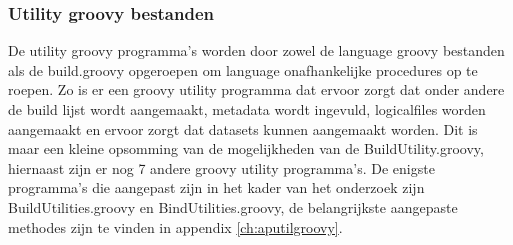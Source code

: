 \subsubsection{Utility groovy bestanden}
De utility groovy programma's worden door zowel de language groovy bestanden als de build.groovy opgeroepen om language onafhankelijke procedures op te roepen. Zo is er een groovy utility programma dat ervoor zorgt dat onder andere de build lijst wordt aangemaakt, metadata wordt ingevuld, logicalfiles worden aangemaakt en ervoor zorgt dat datasets kunnen aangemaakt worden. Dit is maar een kleine opsomming van de mogelijkheden van de BuildUtility.groovy, hiernaast zijn er nog 7 andere groovy utility programma's. De enigste programma's die aangepast zijn in het kader van het onderzoek zijn BuildUtilities.groovy en BindUtilities.groovy, de belangrijkste aangepaste methodes zijn te vinden in appendix \ref{ch:aputilgroovy}. 
\\ \\
